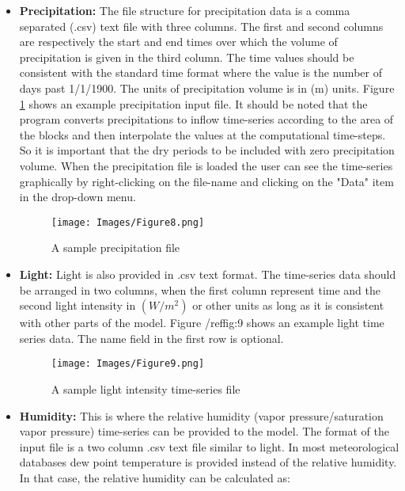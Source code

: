 \begin{itemize}
\item %
\textbf{Precipitation: }  The file structure for precipitation data is a comma separated (.csv) text file with three columns. The first and second columns are respectively the start and end times over which the volume of precipitation is given in the third column. The time values should be consistent with the standard time format where the value is the number of days past 1/1/1900. The units of precipitation volume is in (m) units. Figure \ref{fig:8} shows an example precipitation input file. It should be noted that the program converts precipitations to inflow time-series according to the area of the blocks and then interpolate the values at the computational time-steps. So it is important that the dry periods to be included with zero precipitation volume. When the precipitation file is loaded the user can see the time-series graphically by right-clicking on the file-name and clicking on the "Data" item in the drop-down menu. 
\begin{figure}[!ht]\label{fig:8}
\begin{center}
\texttt{[image: Images/Figure8.png]} \\
\caption{A sample precipitation file} 
\end{center}
\end{figure} %
\item %
\textbf{Light: } Light is also provided in .csv text format. The time-series data should be arranged in two columns, when the first column represent time and the second light intensity in $(W/m^2)$ or other units as long as it is consistent with other parts of the model. Figure /ref{fig:9} shows an example light time series data. The name field in the first row is optional. 
\begin{figure}[!ht]\label{fig:9}
\begin{center}
\texttt{[image: Images/Figure9.png]} \\
\caption{A sample light intensity time-series file} 
\end{center}
\end{figure} %
\item %
\textbf{Humidity: } This is where the relative humidity (vapor pressure/saturation vapor pressure) time-series can be provided to the model. The format of the input file is a two column .csv text file similar to light. In most meteorological databases dew point temperature is provided instead of the relative humidity. In that case, the relative humidity can be calculated as:

\end{itemize}
